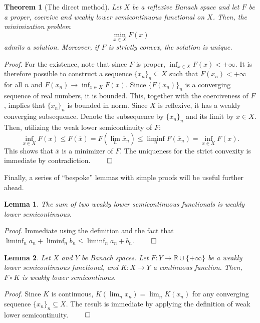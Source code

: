 \documentclass[twocolumn,twoside,a4paper,10pt]{IEEEtran}
\newtheorem{theorem}{Theorem}
\newtheorem{lemma}{Lemma}
\begin{document}
\begin{theorem}[The direct method]\label{thm:direct-method}
  Let \(X\) be a reflexive Banach space and let \(F\) be a proper, coercive and weakly lower semicontinuous functional on \(X\). Then, the minimization problem
  \[
    \min_{x\in X} F(x)
  \]
  admits a solution. Moreover, if \(F\) is strictly convex, the solution is unique.
\end{theorem}
\textit{Proof.} For the existence, note that since \(F\) is proper, \(\inf_{x\in X} F(x)<+\infty\). It is therefore possible to construct a sequence \(\{x_n\}_n\subseteq X\) such that \(F(x_n)<+\infty\) for all \(n\) and \(F(x_n)\to \inf_{x\in X}F(x)\). Since \(\{F(x_n)\}_n\) is a converging sequence of real numbers, it is bounded. This, together with the coerciveness of \(F\), implies that \(\{x_n\}_n\) is bounded in norm. Since \(X\) is reflexive, it has a weakly converging subsequence. Denote the subsequence by \(\{\overline{x}_n\}_n\) and its limit by \(\overline{x}\in X\). Then, utilizing the weak lower semicontinuity of \(F\):
\[
  \inf_{x\in X}F(x) \leq F(\overline{x})=F(\lim_n \overline{x}_n)\leq\liminf_nF(\overline{x}_n)=\inf_{x\in X}F(x)
.\]
This shows that \(\overline{x}\) is a minimizer of \(F\). The uniqueness for the strict convexity is immediate by contradiction. \(\qed\)

Finally, a series of ``bespoke'' lemmas with simple proofs will be useful further ahead.

\begin{lemma}\label{lemma:sum-of-lsc}
  The sum of two weakly lower semicontinuous functionals is weakly lower semicontinuous.
\end{lemma}

\textit{Proof.} Immediate using the definition and the fact that \(\liminf_n{a_n} + \liminf_n{b_n}\leq \liminf_n{a_n + b_n}\). \(\qed\)

\begin{lemma}\label{lemma:precomposition-with-linear}
  Let \(X\) and \(Y\) be Banach spaces. Let \(F\colon Y\to \mathbb{R}\cup\{+\infty\}\) be a weakly lower semicontinuous functional, and \(K\colon X\to Y\) a continuous function. Then, \(F\circ K\) is weakly lower semicontinous.
\end{lemma}

\textit{Proof.} Since \(K\) is continuous, \(K(\lim_n x_n) = \lim_n K(x_n)\) for any converging sequence \(\{x_n\}_n\subseteq X\). The result is immediate by applying the definition of weak lower semicontinuity. \(\qed\)
\end{document}
